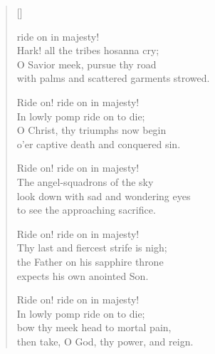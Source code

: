 \newHymn
{}

\begin{verse}[\versewidth]

 ride on in majesty!\\
Hark! all the tribes hosanna cry;\\
O Savior meek, pursue thy road\\
with palms and scattered garments strowed.

Ride on! ride on in majesty!\\
In lowly pomp ride on to die;\\
O Christ, thy triumphs now begin\\
o'er captive death and conquered sin.

Ride on! ride on in majesty!\\
The angel-squadrons of the sky\\
look down with sad and wondering eyes\\
to see the approaching sacrifice.

Ride on! ride on in majesty!\\
Thy last and fiercest strife is nigh;\\
the Father on his sapphire throne\\
expects his own anointed Son.

Ride on! ride on in majesty!\\
In lowly pomp ride on to die;\\
bow thy meek head to mortal pain,\\
then take, O God, thy power, and reign.

\end{verse}


